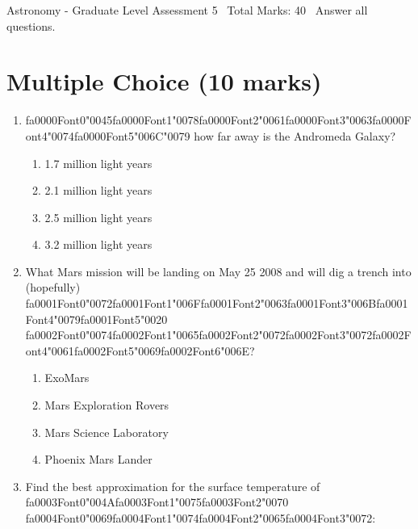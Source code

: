 \documentclass[12pt]{article}
\begin{document}
\begin{center}
Astronomy - Graduate Level Assessment 5 \
Total Marks: 40 \
Answer all questions.
\end{center}

\section*{Multiple Choice (10 marks)}
\begin{enumerate}[label=\arabic*.]
\item {\csname fa0000Font0\endcsname\char"0045}{\csname fa0000Font1\endcsname\char"0078}{\csname fa0000Font2\endcsname\char"0061}{\csname fa0000Font3\endcsname\char"0063}{\csname fa0000Font4\endcsname\char"0074}{\csname fa0000Font5\endcsname\char"006C}{\char"0079} how far away is the Andromeda Galaxy?
\begin{enumerate}[label=(\alph*)]
    \item 1.7 million light years
    \item 2.1 million light years
    \item 2.5 million light years
    \item 3.2 million light years
\end{enumerate}
\item What Mars mission will be landing on May 25 2008 and will dig a trench into (hopefully)
{\csname fa0001Font0\endcsname\char"0072}{\csname fa0001Font1\endcsname\char"006F}{\csname fa0001Font2\endcsname\char"0063}{\csname fa0001Font3\endcsname\char"006B}{\csname fa0001Font4\endcsname\char"0079}{\csname fa0001Font5\endcsname\char"0020} {\csname fa0002Font0\endcsname\char"0074}{\csname fa0002Font1\endcsname\char"0065}{\csname fa0002Font2\endcsname\char"0072}{\csname fa0002Font3\endcsname\char"0072}{\csname fa0002Font4\endcsname\char"0061}{\csname fa0002Font5\endcsname\char"0069}{\csname fa0002Font6\endcsname\char"006E}?
\begin{enumerate}[label=(\alph*)]
    \item ExoMars
    \item Mars Exploration Rovers
    \item Mars Science Laboratory
    \item Phoenix Mars Lander
\end{enumerate}
\item Find the best approximation for the surface temperature of {\csname fa0003Font0\endcsname\char"004A}{\csname fa0003Font1\endcsname\char"0075}{\csname fa0003Font2\endcsname\char"0070} {\csname fa0004Font0\endcsname\char"0069}{\csname fa0004Font1\endcsname\char"0074}{\csname fa0004Font2\endcsname\char"0065}{\csname fa0004Font3\endcsname\char"0072}:

\end{enumerate}
\end{document}
